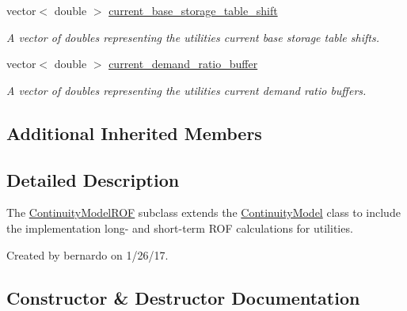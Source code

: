 \begin{DoxyCompactItemize}
vector$<$ double $>$ \mbox{\hyperlink{classContinuityModelROF_acaebccba4f4ed286c5da02d6c2c90605}{current\+\_\+base\+\_\+storage\+\_\+table\+\_\+shift}}
\begin{DoxyCompactList}\small\item\em A vector of doubles representing the utilities\textquotesingle{} current base storage table shifts. \end{DoxyCompactList}\item 
vector$<$ double $>$ \mbox{\hyperlink{classContinuityModelROF_a1a274033b741e664268515de8e8eb3bc}{current\+\_\+demand\+\_\+ratio\+\_\+buffer}}
\begin{DoxyCompactList}\small\item\em A vector of doubles representing the utilities\textquotesingle{} current demand ratio buffers. \end{DoxyCompactList}\end{DoxyCompactItemize}
\subsection*{Additional Inherited Members}


\subsection{Detailed Description}
The {\ttfamily \mbox{\hyperlink{classContinuityModelROF}{Continuity\+Model\+R\+OF}}} subclass extends the {\ttfamily \mbox{\hyperlink{classContinuityModel}{Continuity\+Model}}} class to include the implementation long-\/ and short-\/term R\+OF calculations for utilities. 

Created by bernardo on 1/26/17. 

\subsection{Constructor \& Destructor Documentation}
\mbox{\label{classContinuityModelROF_a23bd422349e4e2246bd44b2007564fd1}} 
